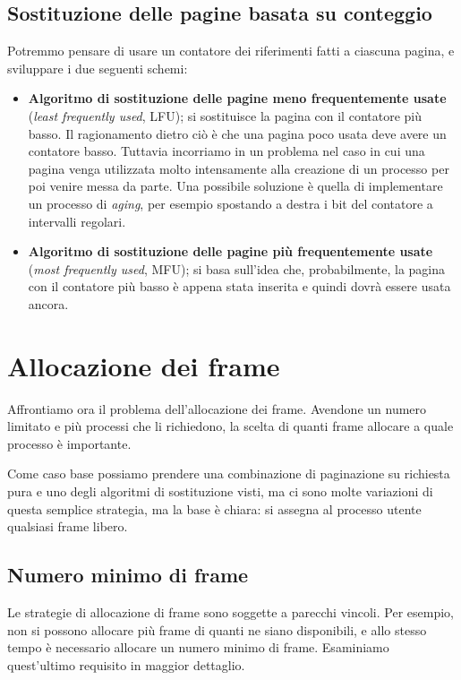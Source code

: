     \subsection{Sostituzione delle pagine basata su conteggio}
        Potremmo pensare di usare un contatore dei riferimenti fatti a ciascuna pagina, e sviluppare i due seguenti schemi:
        \begin{itemize}
            \item \textbf{Algoritmo di sostituzione delle pagine meno frequentemente usate} (\textit{least frequently used}, LFU); si sostituisce la pagina con il contatore più basso. Il ragionamento dietro ciò è che una pagina poco usata deve avere un contatore basso. Tuttavia incorriamo in un problema nel caso in cui una pagina venga utilizzata molto intensamente alla creazione di un processo per poi venire messa da parte. Una possibile soluzione è quella di implementare un processo di \textit{aging}, per esempio spostando a destra i bit del contatore a intervalli regolari.
            
            \item \textbf{Algoritmo di sostituzione delle pagine più frequentemente usate} (\textit{most frequently used}, MFU); si basa sull'idea che, probabilmente, la pagina con il contatore più basso è appena stata inserita e quindi dovrà essere usata ancora.  
        \end{itemize}
        
\section{Allocazione dei frame}
    Affrontiamo ora il problema dell'allocazione dei frame. Avendone un numero limitato e più processi che li richiedono, la scelta di quanti frame allocare a quale processo è importante.
    
    Come caso base possiamo prendere una combinazione di paginazione su richiesta pura e uno degli algoritmi di sostituzione visti, ma ci sono molte variazioni di questa semplice strategia, ma la base è chiara: si assegna al processo utente qualsiasi frame libero.
    
    \subsection{Numero minimo di frame}
        Le strategie di allocazione di frame sono soggette a parecchi vincoli. Per esempio, non si possono allocare più frame di quanti ne siano disponibili, e allo stesso tempo è necessario allocare un numero minimo di frame. Esaminiamo quest'ultimo requisito in maggior dettaglio.
        
